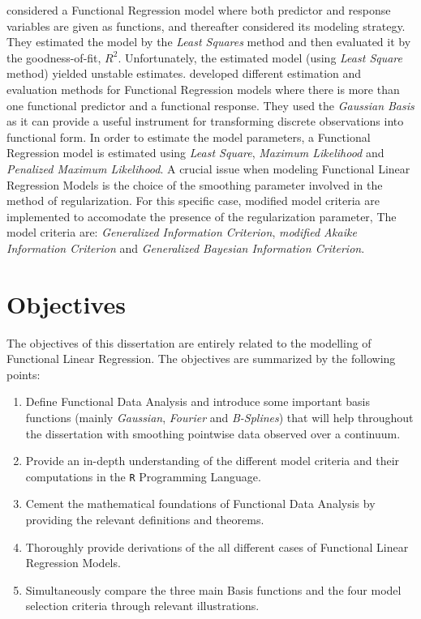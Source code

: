 \cite{Reference1} considered a Functional Regression model where both predictor and response variables are given as functions, and thereafter \cite{olberd:ramsay} considered its modeling strategy. They estimated the model by the \textit{Least Squares} method and then evaluated it by the goodness-of-fit, $R^2$. Unfortunately, the estimated model (using \textit{Least Square} method) yielded unstable estimates. \citet*{Matsui2009} developed different estimation and evaluation methods for Functional Regression models where there is more than one functional predictor and a functional response. They used the \textit{Gaussian Basis} as it can provide a useful instrument for transforming discrete observations into functional form. In order to estimate the model parameters, a Functional Regression model is estimated using \textit{Least Square}, \textit{Maximum Likelihood} and \textit{Penalized Maximum Likelihood}. A crucial issue when modeling Functional Linear Regression Models is the choice of the smoothing parameter involved in the method of regularization. For this specific case, modified model criteria are implemented to accomodate the presence of the regularization parameter, The model criteria are: \textit{Generalized Information Criterion}, \textit{modified Akaike Information Criterion} and \textit{Generalized Bayesian Information Criterion}.     



\section{Objectives}

The objectives of this dissertation are entirely related to the modelling of Functional Linear Regression. The objectives are summarized by the following points:

\begin{enumerate}
\item Define Functional Data Analysis and introduce some important basis functions (mainly \textit{Gaussian}, \textit{Fourier} and \textit{B-Splines}) that will help throughout the dissertation with smoothing pointwise data observed over a continuum. 
\item Provide an in-depth understanding of the different model criteria and their computations in the \texttt{R} Programming Language.
\item Cement the mathematical foundations of Functional Data Analysis by providing the relevant definitions and theorems.
\item Thoroughly provide derivations of the all different cases of Functional Linear Regression Models.
\item Simultaneously compare the three main Basis functions and the four model selection criteria through relevant illustrations.  
\end{enumerate}


